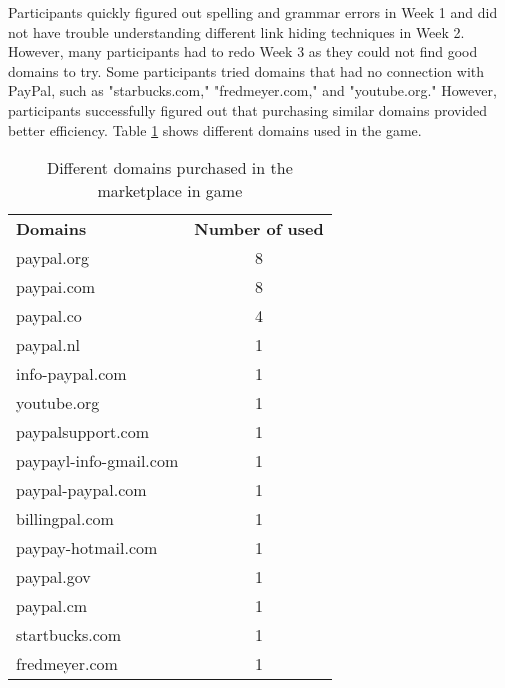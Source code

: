 Participants quickly figured out spelling and grammar errors in Week 1 and did not have trouble understanding different link hiding techniques in Week 2. However, many participants had to redo Week 3 as they could not find good domains to try. Some participants tried domains that had no connection with PayPal, such as "starbucks.com," "fredmeyer.com," and "youtube.org." However, participants successfully figured out that purchasing similar domains provided better efficiency. Table \ref{tab:marketplace_domains} shows different domains used in the game.

\begin{table}[!ht]
    \centering
    \begin{tabular}{l c  }
        \hline
        \textbf{Domains}       & \textbf{Number of used} \\
        paypal.org             & 8                       \\
        paypai.com             & 8                       \\
        paypal.co              & 4                       \\
        paypal.nl              & 1                       \\
        info-paypal.com        & 1                       \\
        youtube.org            & 1                       \\
        paypalsupport.com      & 1                       \\
        paypayl-info-gmail.com & 1                       \\
        paypal-paypal.com      & 1                       \\
        billingpal.com         & 1                       \\
        paypay-hotmail.com     & 1                       \\
        paypal.gov             & 1                       \\
        paypal.cm              & 1                       \\
        startbucks.com         & 1                       \\
        fredmeyer.com          & 1                       \\
        \hline
    \end{tabular}
    \caption{Different domains purchased in the marketplace in game}
    \label{tab:marketplace_domains}
\end{table}


